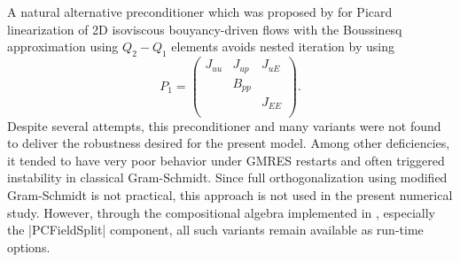 A natural alternative preconditioner which was proposed by \citet{elman2011bouyancy} for Picard linearization of 2D isoviscous bouyancy-driven flows with the Boussinesq approximation using $Q_2-Q_1$ elements avoids nested iteration by using
\begin{equation*}
  P_1 =
  \begin{pmatrix}
    J_{uu} & J_{up} & J_{uE} \\
     & B_{pp} & \\
    & & J_{EE} \\
  \end{pmatrix} .
\end{equation*}
Despite several attempts, this preconditioner and many variants were not found to deliver the robustness desired for the present model.
Among other deficiencies, it tended to have very poor behavior under GMRES restarts and often triggered instability in classical Gram-Schmidt.
Since full orthogonalization using modified Gram-Schmidt is not practical, this approach is not used in the present numerical study.
However, through the compositional algebra implemented in {\PETSc}, especially the \cverb|PCFieldSplit| component, all such variants remain available as run-time options.
